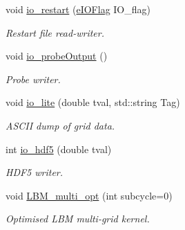\begin{DoxyCompactItemize}
void \hyperlink{class_grid_obj_a94551d2e383da4b2a2c930488d436a42}{io\+\_\+restart} (\hyperlink{_grid_obj_8h_ad1926c22ad82853adff44c4b76b97827}{e\+I\+O\+Flag} I\+O\+\_\+flag)
\begin{DoxyCompactList}\small\item\em Restart file read-\/writer. \end{DoxyCompactList}\item 
void \hyperlink{class_grid_obj_af7e8782f95d15884d761cc4f1d5926c0}{io\+\_\+probe\+Output} ()
\begin{DoxyCompactList}\small\item\em Probe writer. \end{DoxyCompactList}\item 
void \hyperlink{class_grid_obj_acf311bbf350fd48104663eaabebca835}{io\+\_\+lite} (double tval, std\+::string Tag)
\begin{DoxyCompactList}\small\item\em A\+S\+C\+II dump of grid data. \end{DoxyCompactList}\item 
int \hyperlink{class_grid_obj_adc960ac818748b839e81d1375782caa7}{io\+\_\+hdf5} (double tval)
\begin{DoxyCompactList}\small\item\em H\+D\+F5 writer. \end{DoxyCompactList}\item 
void \hyperlink{class_grid_obj_ac65e9a1a8aa854d25281780d6b52665b}{L\+B\+M\+\_\+multi\+\_\+opt} (int subcycle=0)
\begin{DoxyCompactList}\small\item\em Optimised L\+BM multi-\/grid kernel. \end{DoxyCompactList}\end{DoxyCompactItemize}
